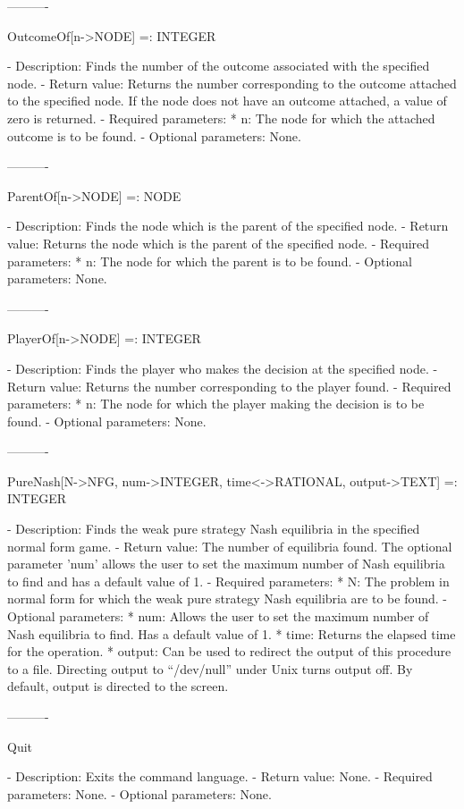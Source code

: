 ----------

OutcomeOf[n->NODE] =: INTEGER

   -	Description:  Finds the number of the outcome associated with the 
	specified node.
   -	Return value:  Returns the number corresponding to the outcome attached
	to the specified node.  If the node does not have an outcome attached,
	a value of zero is returned.
   -	Required parameters:
	  *  n:  The node for which the attached outcome is to be found.
   -	Optional parameters:  None.

----------

ParentOf[n->NODE] =: NODE

   -	Description:  Finds the node which is the parent of the specified node.
   -	Return value:  Returns the node which is the parent of the specified
	node.
   -	Required parameters:
	  *  n:  The node for which the parent is to be found.
   -	Optional parameters:  None.

----------

PlayerOf[n->NODE] =: INTEGER

   -	Description:  Finds the player who makes the decision at the specified
	node.
   -	Return value:  Returns the number corresponding to the player found.
   -	Required parameters:
	  *  n:  The node for which the player making the decision is to be
		found.
   -	Optional parameters:  None.

----------

PureNash[N->NFG, {num->INTEGER}, {time<->RATIONAL}, {output->TEXT}]
	 =: INTEGER

   -	Description:  Finds the weak pure strategy Nash equilibria in the 
	specified normal form game.  
   -	Return value:  The number of equilibria found.  The optional parameter 
	'num' allows the user to set the maximum number of Nash equilibria to 
	find and has a default value of 1.
   -	Required parameters:
	  *  N:  The problem in normal form for which the weak pure strategy
		Nash equilibria are to be found.
   -	Optional parameters:
	  *  num:  Allows the user to set the maximum number of Nash equilibria
		to find.  Has a default value of 1.
	  *  time:  Returns the elapsed time for the operation.
	  *  output:  Can be used to redirect the output of this procedure to a
		file.  Directing output to ``/dev/null'' under Unix turns 
		output off.  By default, output is directed to the screen.  

----------

Quit

   -	Description:  Exits the command language.
   -	Return value:  None.
   -	Required parameters:  None.
   -	Optional parameters:  None.

